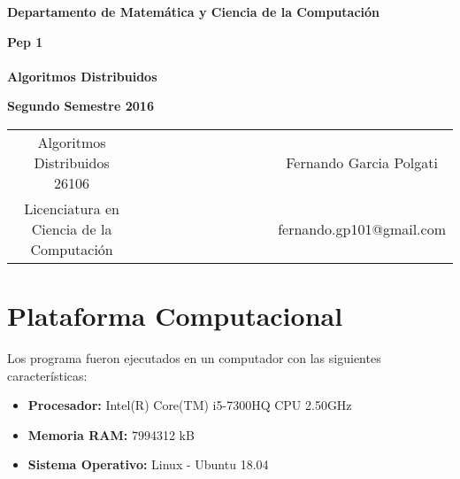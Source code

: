 \documentclass{report}
\begin{document}
\begin{titlepage}
\begin{center}
\end{center}
\begin{center}
{\bf Departamento de Matem\'atica y Ciencia de la Computaci\'on}
\end{center}
\vspace{3cm}
\begin{center}
%
%
{\Large \bf Pep 1 \\
~~ \\
Algoritmos Distribuidos}
%
%
\end{center}
\begin{center}
%
%
%
{\large \bf Segundo Semestre 2016}
%
%
\end{center}
\vspace{5cm}
\begin{tabular}{c l c}
%
%
%
Algoritmos Distribuidos 26106 & ~~~~~~~~~~~~~~~~~ & Fernando Garcia Polgati \\
%
%
%
Licenciatura en Ciencia de la Computaci\'on & ~~ & fernando.gp101@gmail.com
%
%
\end{tabular}
\end{titlepage}
%

%
\section{Plataforma Computacional}
Los programa fueron ejecutados en un computador con las siguientes caracter\'isticas:
\begin{itemize}
\item {\bf Procesador:} Intel(R) Core(TM) i5-7300HQ CPU 2.50GHz
\item {\bf Memoria RAM:} 7994312 kB
\item {\bf Sistema Operativo:} Linux - Ubuntu 18.04
\end{itemize}
%
\end{document}
